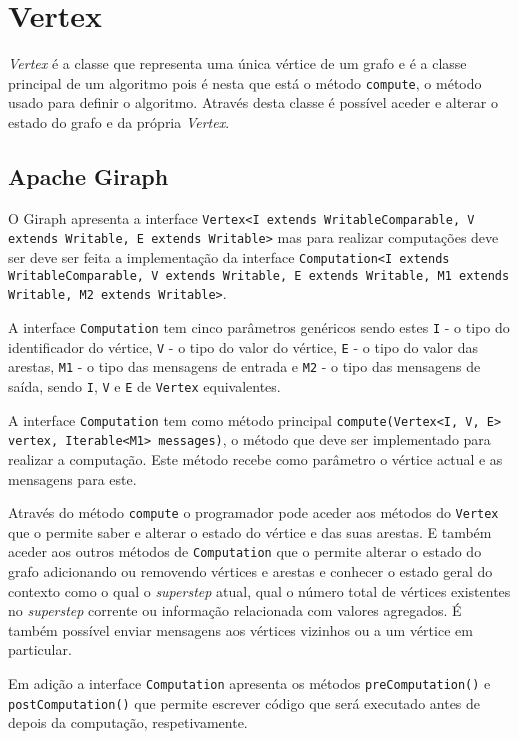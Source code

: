 \newpage
\section{Vertex}
\textit{Vertex} é a classe que representa uma única vértice de um grafo e é a classe principal de um algoritmo pois é nesta que está o método \texttt{compute}, o método usado para definir o algoritmo. Através desta classe é possível aceder e alterar o estado do grafo e da própria \textit{Vertex}.
\subsection*{Apache Giraph}


O Giraph apresenta a interface \texttt{Vertex<I extends WritableComparable, V extends Writable, E extends Writable>} mas para realizar computações deve ser deve ser feita a implementação da interface \texttt{Computation<I extends WritableComparable, V extends Writable, E extends Writable, M1 extends Writable, M2 extends Writable>}.

A interface \texttt{Computation} tem cinco parâmetros genéricos sendo estes \texttt{I} - o tipo do identificador do vértice, \texttt{V} - o tipo do valor do vértice, \texttt{E} - o tipo do valor das arestas, \texttt{M1} - o tipo das mensagens de entrada e \texttt{M2} - o tipo das mensagens de saída, sendo \texttt{I}, \texttt{V} e \texttt{E} de \texttt{Vertex} equivalentes.

A interface \texttt{Computation} tem como método principal \texttt{compute(Vertex<I, V, E> vertex, Iterable<M1> messages)}, o método que deve ser implementado para realizar a computação. Este método recebe como parâmetro o vértice actual e as mensagens para este.

Através do método \texttt{compute} o programador pode aceder aos métodos do \texttt{Vertex} que o permite saber e alterar o estado do vértice e das suas arestas. E também aceder aos outros métodos de \texttt{Computation} que o permite alterar o estado do grafo adicionando ou removendo vértices e arestas e conhecer o estado geral do contexto como o qual o \textit{superstep} atual, qual o número total de vértices existentes no \textit{superstep} corrente ou informação relacionada com valores agregados. É também possível enviar mensagens aos vértices vizinhos ou a um vértice em particular.

Em adição a interface \texttt{Computation} apresenta os métodos \texttt{preComputation()} e \texttt{postComputation()} que permite escrever código que será executado antes de depois da computação, respetivamente.

